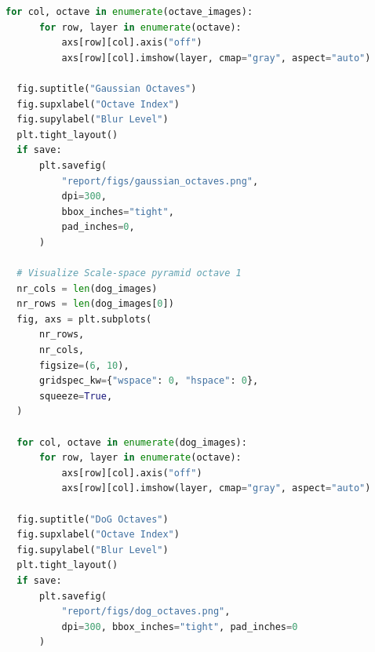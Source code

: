 \documentclass[11pt,a4paper]{article}
\begin{document}
\begin{lstlisting}[language=Python, caption=Scale-space peak detection]
  for col, octave in enumerate(octave_images):
      for row, layer in enumerate(octave):
          axs[row][col].axis("off")
          axs[row][col].imshow(layer, cmap="gray", aspect="auto")

  fig.suptitle("Gaussian Octaves")
  fig.supxlabel("Octave Index")
  fig.supylabel("Blur Level")
  plt.tight_layout()
  if save:
      plt.savefig(
          "report/figs/gaussian_octaves.png",
          dpi=300,
          bbox_inches="tight",
          pad_inches=0,
      )

  # Visualize Scale-space pyramid octave 1
  nr_cols = len(dog_images)
  nr_rows = len(dog_images[0])
  fig, axs = plt.subplots(
      nr_rows,
      nr_cols,
      figsize=(6, 10),
      gridspec_kw={"wspace": 0, "hspace": 0},
      squeeze=True,
  )

  for col, octave in enumerate(dog_images):
      for row, layer in enumerate(octave):
          axs[row][col].axis("off")
          axs[row][col].imshow(layer, cmap="gray", aspect="auto")

  fig.suptitle("DoG Octaves")
  fig.supxlabel("Octave Index")
  fig.supylabel("Blur Level")
  plt.tight_layout()
  if save:
      plt.savefig(
          "report/figs/dog_octaves.png",
          dpi=300, bbox_inches="tight", pad_inches=0
      )
\end{lstlisting}
\end{document}
